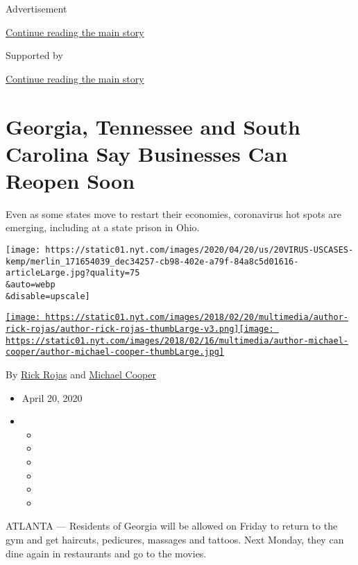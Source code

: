 Advertisement

\protect\hyperlink{after-top}{Continue reading the main story}

Supported by

\protect\hyperlink{after-sponsor}{Continue reading the main story}

\hypertarget{georgia-tennessee-and-south-carolina-say-businesses-can-reopen-soon}{%
\section{Georgia, Tennessee and South Carolina Say Businesses Can Reopen
Soon}\label{georgia-tennessee-and-south-carolina-say-businesses-can-reopen-soon}}

Even as some states move to restart their economies, coronavirus hot
spots are emerging, including at a state prison in Ohio.

\texttt{[image: https://static01.nyt.com/images/2020/04/20/us/20VIRUS-USCASES-kemp/merlin\_171654039\_dec34257-cb98-402e-a79f-84a8c5d01616-articleLarge.jpg?quality=75\\\&auto=webp\\\&disable=upscale]}

\href{https://www.nytimes.com/by/rick-rojas}{\texttt{[image: https://static01.nyt.com/images/2018/02/20/multimedia/author-rick-rojas/author-rick-rojas-thumbLarge-v3.png]}}\href{https://www.nytimes.com/by/michael-cooper}{\texttt{[image: https://static01.nyt.com/images/2018/02/16/multimedia/author-michael-cooper/author-michael-cooper-thumbLarge.jpg]}}

By \href{https://www.nytimes.com/by/rick-rojas}{Rick Rojas} and
\href{https://www.nytimes.com/by/michael-cooper}{Michael Cooper}

\begin{itemize}
\item
  April 20, 2020
\item
  \begin{itemize}
  \item
  \item
  \item
  \item
  \item
  \item
  \end{itemize}
\end{itemize}

ATLANTA --- Residents of Georgia will be allowed on Friday to return to
the gym and get haircuts, pedicures, massages and tattoos. Next Monday,
they can dine again in restaurants and go to the movies.

